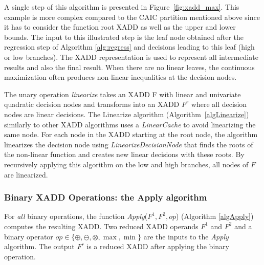\documentclass[twoside,11pt]{article}
\begin{document}

A single step of this algorithm is presented in Figure~\ref{fig:xadd_max}. This example is more complex compared to the CAIC partition mentioned above since it has to consider the function root XADD as well as the upper and lower bounds. The input to this illustrated step is the leaf node obtained after the regression step of Algorithm \ref{alg:regress} and decisions leading to this leaf (high or low branches).  The XADD representation is used to represent all intermediate results and also the final result. When there are no linear leaves, the continuous maximization often produces non-linear inequalities at the decision nodes. 

The unary operation \emph{linearize} takes an XADD F with linear and univariate quadratic decision nodes and transforms into an XADD $F^r$ where all decision nodes are linear decisions.
The Linearize algorithm (Algorithm~\ref{algLinearize}) similarly to other XADD algorithms uses a \emph{LinearCache} to avoid linearizing the same node. For each node in the XADD starting at the root node, the algorithm linearizes the decision node using \emph{LinearizeDecisionNode} that finds the roots of the non-linear function and creates new linear decisions with these roots. By recursively applying this algorithm on the low and high branches, all nodes of $F$ are linearized.
%

\subsubsection{Binary XADD Operations: the Apply algorithm}

For \emph{all} binary operations, the function \emph{Apply}($F^1,F^2,\mathit{op}$) (Algorithm \ref{algApply}) computes the resulting XADD. 
Two reduced XADD operands $F^1$ and $F^2$ and a binary operator $\mathit{op} \in \{ \oplus, \ominus, \otimes , \max , \min \} $ are the inputs to the \emph{Apply} algorithm. The output $F^r$ is a reduced XADD after applying the binary operation. 
\end{document}
